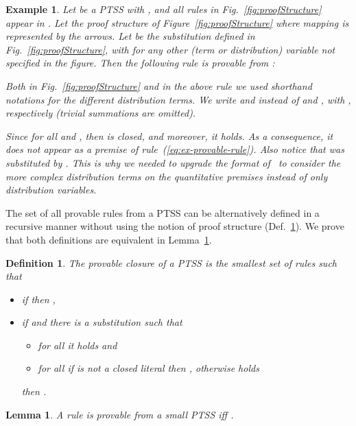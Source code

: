 \documentclass[submission,copyright,creativecommons]{eptcs}
\newtheorem{example}{Example}
\newtheorem{definition}{Definition}
\newtheorem{lemma}{Lemma}
\begin{document}
\begin{example} \label{ex:proofStructure}
 Let  be a PTSS with
 ,
  and all rules in
 Fig.~\ref{fig:proofStructure} appear in .
Let  the proof structure of
 Figure~\ref{fig:proofStructure} where mapping  is represented
 by the arrows.
Let  be the substitution defined in
 Fig.~\ref{fig:proofStructure}, with  for any
 other (term or distribution) variable not specified in the figure.
Then the following rule is provable from :

Both in Fig.~\ref{fig:proofStructure} and in the above rule we used
 shorthand notations for the different distribution terms.  We write
  and  instead of
  and , with ,
 respectively (trivial summations are omitted).

 Since  for all  and , then  is closed, and moreover, it holds.  As a consequence, it does not
 appear as a premise of rule~(\ref{eq:ex-provable-rule}).
Also notice that  was substituted by .  This is why we needed to upgrade the format
 of~\cite{DL-fossacs12} to consider the more complex distribution
 terms on the quantitative premises instead of only distribution
 variables.
\end{example}


The set of all provable rules from a PTSS can be alternatively defined
in a recursive manner without using the notion of proof structure
(Def.~\ref{def:provClosure}). We prove that both definitions are
equivalent in Lemma~\ref{lemma:closure}.



\begin{definition}\label{def:provClosure}
 The \emph{provable closure} of a PTSS  
  is the smallest set  of rules such that
\begin{itemize}
 \item if  then ,
 \item if  and there is a substitution  such that 
 \begin{itemize}
    \item for all  it holds   and
    \item for all  if  is not a closed literal then , otherwise  holds
 \end{itemize}   
  then  .
\end{itemize}
\end{definition}

\begin{lemma}\label{lemma:closure}
 A rule  is provable from a small PTSS  iff
 .
\end{lemma}
\end{document}
